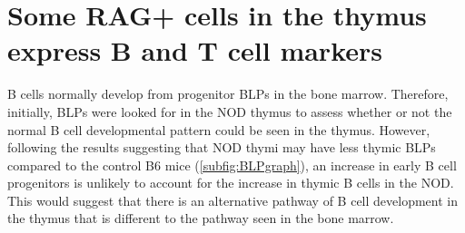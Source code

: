 


\section{Some RAG+ cells in the thymus express B and T cell markers}

B cells normally develop from progenitor BLPs in the bone marrow.
Therefore, initially, BLPs were looked for in the NOD thymus to assess whether or not the normal B cell developmental pattern could be seen in the thymus.
However, following the results suggesting that NOD thymi may have less thymic BLPs compared to the control B6 mice (\cref{subfig:BLPgraph}), an increase in early B cell progenitors is unlikely to account for the increase in thymic B cells in the NOD.
This would suggest that there is an alternative pathway of B cell development in the thymus that is different to the pathway seen in the bone marrow.

